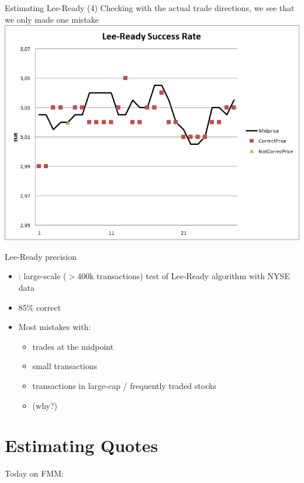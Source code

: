 \documentclass[english,10pt]{beamer}
\begin{document}
\begin{frame}{Estimating Lee-Ready (4)}
	Checking with the actual trade directions, we see that we only made one mistake
	\center
	\includegraphics[scale=0.39]{pics/L2_leereadysuccess}
\end{frame}


\begin{frame}{Lee-Ready precision}
	\begin{itemize}
		\item \citet{odders-white_occurrence_2000}: large-scale ($>400$k transactions) test of Lee-Ready algorithm with NYSE data
		\item 85\% correct
		\item Most mistakes with:
		\begin{itemize}
			\item trades at the midpoint
			\item small transactions
			\item transactions in large-cap / frequently traded stocks
			\item (why?)
		\end{itemize}
	\end{itemize}
\end{frame}



\section{Estimating Quotes}

\begin{frame}{Today on FMM:}
	\tableofcontents[currentsection]
\end{frame}
\end{document}

